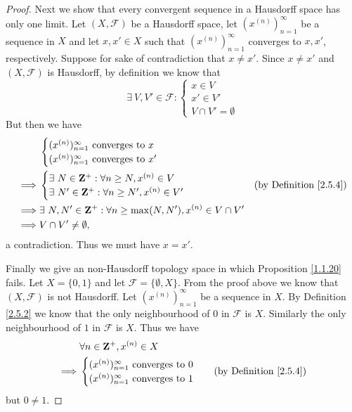 \begin{proof}
    Next we show that every convergent sequence in a Hausdorff space has only one limit.
    Let \((X, \mathcal{F})\) be a Hausdorff space, let \((x^{(n)})_{n = 1}^\infty\) be a sequence in \(X\) and let \(x, x' \in X\) such that \((x^{(n)})_{n = 1}^\infty\) converges to \(x, x'\), respectively.
    Suppose for sake of contradiction that \(x \neq x'\).
    Since \(x \neq x'\) and \((X, \mathcal{F})\) is Hausdorff, by definition we know that
    \[
        \exists\ V, V' \in \mathcal{F} : \begin{cases}
            x \in V   \\
            x' \in V' \\
            V \cap V' = \emptyset
        \end{cases}
    \]
    But then we have
    \begin{align*}
                 & \begin{cases}
                       (x^{(n)})_{n = 1}^\infty \text{ converges to } x \\
                       (x^{(n)})_{n = 1}^\infty \text{ converges to } x'
                   \end{cases}                                    \\
        \implies & \begin{cases}
                       \exists\ N \in \mathbf{Z}^+ : \forall n \geq N, x^{(n)} \in V \\
                       \exists\ N' \in \mathbf{Z}^+ : \forall n \geq N', x^{(n)} \in V'
                   \end{cases}                    & \text{(by Definition \ref{2.5.4})}                 \\
        \implies & \exists\ N, N' \in \mathbf{Z}^+ : \forall n \geq \max(N, N'), x^{(n)} \in V \cap V' \\
        \implies & V \cap V' \neq \emptyset,
    \end{align*}
    a contradiction.
    Thus we must have \(x = x'\).

    Finally we give an non-Hausdorff topology space in which Proposition \ref{1.1.20} fails.
    Let \(X = \{0, 1\}\) and let \(\mathcal{F} = \{\emptyset, X\}\).
    From the proof above we know that \((X, \mathcal{F})\) is not Hausdorff.
    Let \((x^{(n)})_{n = 1}^\infty\) be a sequence in \(X\).
    By Definition \ref{2.5.2} we know that the only neighbourhood of \(0\) in \(\mathcal{F}\) is \(X\).
    Similarly the only neighbourhood of \(1\) in \(\mathcal{F}\) is \(X\).
    Thus we have
    \begin{align*}
                 & \forall n \in \mathbf{Z}^+, x^{(n)} \in X        \\
        \implies & \begin{cases}
                       (x^{(n)})_{n = 1}^\infty \text{ converges to } 0 \\
                       (x^{(n)})_{n = 1}^\infty \text{ converges to } 1
                   \end{cases} & \text{(by Definition \ref{2.5.4})}
    \end{align*}
    but \(0 \neq 1\).
\end{proof}

